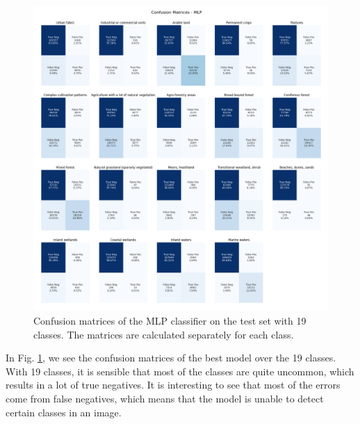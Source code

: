 \begin{figure}[h]
  \centering
  \includegraphics[width=\columnwidth]{images/MLP - confusion matrix.png}
  \caption{Confusion matrices of the MLP classifier on the test set with 19 classes. The matrices are calculated separately for each class.}
  \label{fig:confusion-matrix}
\end{figure}

In Fig. \ref{fig:confusion-matrix}, we see the confusion matrices of the best model over the 19 classes. With 19 classes, it is sensible that most of the classes are quite uncommon, which results in a lot of true negatives. It is interesting to see that most of the errors come from false negatives, which means that the model is unable to detect certain classes in an image.